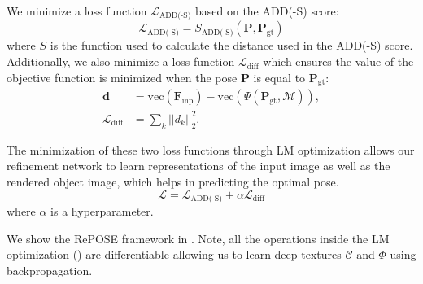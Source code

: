 \documentclass[10pt,twocolumn,letterpaper]{article}
\begin{document}
We minimize a loss function $\mathcal{L}_\text{ADD(-S)}$ based on the ADD(-S) score:
\begin{equation}
  \mathcal{L}_\text{ADD(-S)} = S_\text{ADD(-S)} (\mathbf{P},\mathbf{P}_\text{gt})
\end{equation}
where $S$ is the function used to calculate the distance used in the ADD(-S) score.
Additionally, we also minimize a loss function $\mathcal{L}_\text{diff}$ which ensures the value of the objective function is minimized when the pose $\mathbf{P}$ is equal to $\mathbf{P}_\text{gt}$:
\begin{align}
    \mathbf{d} 
    &= \text{vec}(\mathbf{F}_\text{inp}) - \text{vec}(\Psi(\mathbf{P}_\text{gt}, \mathcal{M})), \\
    \mathcal{L}_\text{diff} 
    &=  \sum_k ||d_k||^2_2.
\end{align}

The minimization of these two loss functions through LM optimization allows our refinement network to learn representations of the input image as well as the rendered object image, which helps in predicting the optimal pose.
\begin{equation}
\mathcal{L} = \mathcal{L}_\text{ADD(-S)} + \alpha \mathcal{L}_\text{diff}
\end{equation}
where $\alpha$ is a hyperparameter.

We show the RePOSE framework in .
Note, all the operations inside the LM optimization () are differentiable allowing us to learn deep textures $\mathcal{C}$ and $\Phi$ using backpropagation. 
\end{document}
